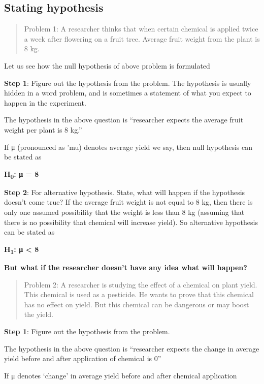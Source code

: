 \documentclass[
]{book}
\begin{document}
\hypertarget{state}{%
\subsection{Stating hypothesis}\label{state}}

\begin{quote}
Problem 1: A researcher thinks that when certain chemical is applied twice a week after flowering on a fruit tree. Average fruit weight from the plant is 8 kg.
\end{quote}

Let us see how the null hypothesis of above problem is formulated

\textbf{Step 1}: Figure out the hypothesis from the problem. The hypothesis is usually hidden in a word problem, and is sometimes a statement of what you expect to happen in the experiment.

The hypothesis in the above question is ``researcher expects the average fruit weight per plant is 8 kg.''

If μ (pronounced as 'mu\textquotesingle) denotes average yield we say, then null hypothesis can be stated as

\textbf{H\textsubscript{0}: μ = 8}

\textbf{Step 2}: For alternative hypothesis. State, what will happen if the hypothesis doesn't come true? If the average fruit weight is not equal to 8 kg, then there is only one assumed possibility that the weight is less than 8 kg (assuming that there is no possibility that chemical will
increase yield). So alternative hypothesis can be stated as

\textbf{H\textsubscript{1}: μ \textless{} 8}

\textbf{But what if the researcher doesn't have any idea what will happen?}

\begin{quote}
Problem 2: A researcher is studying the effect of a chemical on plant yield. This chemical is used as a pesticide. He wants to prove that this chemical has no effect on yield. But this chemical can be dangerous or may boost the yield.
\end{quote}

\textbf{Step 1}: Figure out the hypothesis from the problem.

The hypothesis in the above question is ``researcher expects the change in average yield before and after application of chemical is 0''

If μ denotes `change' in average yield before and after chemical application
\end{document}
